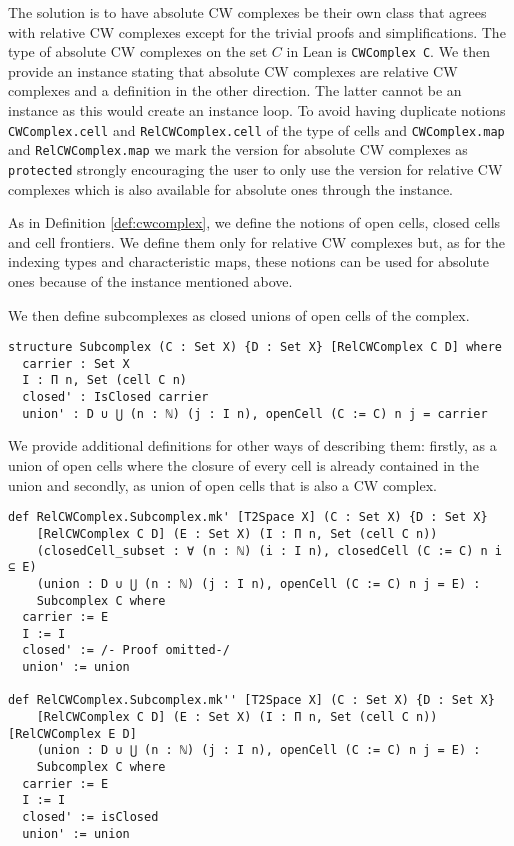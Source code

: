 The solution is to have absolute CW complexes be their own class that agrees with relative CW complexes except for the trivial proofs and simplifications. 
The type of absolute CW complexes on the set $C$ in Lean is \lstinline|CWComplex C|. 
We then provide an instance stating that absolute CW complexes are relative CW complexes and a definition in the other direction.
The latter cannot be an instance as this would create an instance loop. 
To avoid having duplicate notions \lstinline|CWComplex.cell| and \lstinline|RelCWComplex.cell| of the type of cells and \lstinline|CWComplex.map| and \lstinline|RelCWComplex.map| we mark the version for absolute CW complexes as \lstinline|protected| strongly encouraging the user to only use the version for relative CW complexes which is also available for absolute ones through the instance.

As in Definition \ref{def:cwcomplex}, we define the notions of open cells, closed cells and cell frontiers.
We define them only for relative CW complexes but, as for the indexing types and characteristic maps, these notions can be used for absolute ones because of the instance mentioned above. 

We then define subcomplexes as closed unions of open cells of the complex.

\begin{lstlisting}[frame=single]
structure Subcomplex (C : Set X) {D : Set X} [RelCWComplex C D] where
  carrier : Set X
  I : Π n, Set (cell C n)
  closed' : IsClosed carrier
  union' : D ∪ ⋃ (n : ℕ) (j : I n), openCell (C := C) n j = carrier
\end{lstlisting}

We provide additional definitions for other ways of describing them: firstly, as a union of open cells where the closure of every cell is already contained in the union and secondly, as union of open cells that is also a CW complex.

\begin{lstlisting}[frame=single]
def RelCWComplex.Subcomplex.mk' [T2Space X] (C : Set X) {D : Set X} 
    [RelCWComplex C D] (E : Set X) (I : Π n, Set (cell C n))
    (closedCell_subset : ∀ (n : ℕ) (i : I n), closedCell (C := C) n i ⊆ E)
    (union : D ∪ ⋃ (n : ℕ) (j : I n), openCell (C := C) n j = E) : 
    Subcomplex C where
  carrier := E
  I := I
  closed' := /- Proof omitted-/
  union' := union

def RelCWComplex.Subcomplex.mk'' [T2Space X] (C : Set X) {D : Set X} 
    [RelCWComplex C D] (E : Set X) (I : Π n, Set (cell C n)) [RelCWComplex E D]
    (union : D ∪ ⋃ (n : ℕ) (j : I n), openCell (C := C) n j = E) : 
    Subcomplex C where
  carrier := E
  I := I
  closed' := isClosed
  union' := union
\end{lstlisting}

